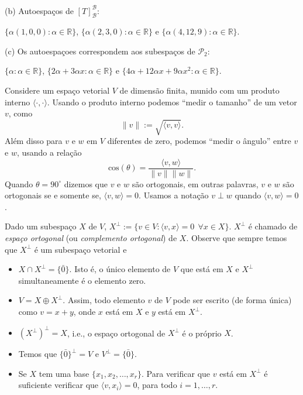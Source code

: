 \documentclass[10pt]{article}
\theoremstyle{plain}
\theoremstyle{obs}
\numberwithin{equation}{section}
\begin{document}
\begin{enumerate}
  (b) Autoespaços de $[T]_{\mathcal{B}}^{\mathcal{B}}$: 
  
  $\{\alpha(1,0,0):\alpha \in \mathbb{R}\}$, 
  $\{\alpha(2,3,0):\alpha \in \mathbb{R}\}$ e
  $\{\alpha(4,12,9):\alpha \in \mathbb{R}\}$.
  
  (c) Os autoespaçoes correspondem aos subespaços de $\mathcal{P}_2$: 
  
  $\{\alpha :\alpha \in \mathbb{R}\}$, 
  $\{2\alpha +3\alpha x:\alpha \in \mathbb{R}\}$ e
  $\{4\alpha+12\alpha x+9\alpha x^{2}:\alpha \in \mathbb{R}\}$.
 \end{enumerate}

Considere um espaço vetorial $V$ de dimensão finita, munido com um 
produto interno $\langle \cdot, \cdot \rangle$.
Usando o produto interno podemos ``medir o tamanho'' de um vetor $v$, como 
$$\|v\|:=\sqrt{\langle v, v \rangle}.$$ 
Além disso para $v$ e $w$ em $V$ diferentes de zero, podemos ``medir o ângulo'' 
entre $v$ e $w$, usando a relação 
$$\text{cos}(\theta)=\frac{\langle v, w\rangle}{\|v\|\|w\|}.$$
Quando $\theta=90^{\circ}$ dizemos que $v$ e $w$ são ortogonais, em outras palavras, 
$v$ e $w$ são ortogonais se e somente se, $\langle v, w \rangle=0$.
Usamos a notação $v \perp w$ quando $\langle v, w \rangle=0$. 

Dado um subespaço $X$ de $V$, $X^{\perp}:=\{ v \in V: \langle v, x \rangle=0 \ \ \forall x \in X\}$.
$X^{\perp}$ é chamado de {\it espaço ortogonal} (ou {\it complemento ortogonal}) de $X$. 
Observe que sempre temos que $X^{\perp}$ é um subespaço vetorial e 
 \begin{itemize}
  \item $X \cap X^{\perp}=\{\bar{0}\}$. Isto é, o único elemento de $V$
  que está em $X$ e $X^{\perp}$ simultaneamente é o elemento zero.
  \item $V=X\oplus X^{\perp}$. Assim, todo elemento $v$ de $V$ pode ser escrito 
  (de forma única) como 
  $v=x+y$, onde $x$ está em $X$ e $y$ está em $X^{\perp}$.
  \item $(X^{\perp})^{\perp}=X$, i.e., o espaço ortogonal de $X^{\perp}$
  é o próprio $X$.
  \item Temos que $\{\bar{0}\}^{\perp}=V$ e $V^{\perp}=\{\bar{0}\}$.
  \item Se $X$ tem uma base $\{x_1,x_2,\dots,x_r\}$. Para verificar que $v$ está em $X^{\perp}$
  é suficiente verificar que $\langle v, x_i \rangle=0$, para todo $i=1,\dots,r$.
 \end{itemize}
\end{document}
